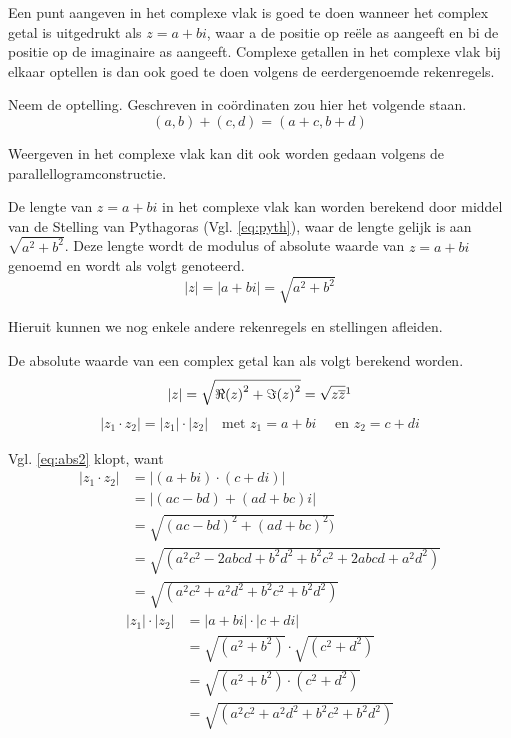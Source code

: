 \documentclass[11pt,fleqn]{book} %
\newcommand*\conj[1]{\overline{#1}}
\begin{document}
Een punt aangeven in het complexe vlak is goed te doen wanneer het complex getal is uitgedrukt als $z = a + bi$, waar a de positie op reële as aangeeft en bi de positie op de imaginaire as aangeeft. Complexe getallen in het complexe vlak bij elkaar optellen is dan ook goed te doen volgens de eerdergenoemde rekenregels.

Neem de optelling. Geschreven in coördinaten zou hier het volgende staan.
\begin{displaymath}
(a,b)+(c,d)=(a+c,b+d)
\end{displaymath}

Weergeven in het complexe vlak kan dit ook worden gedaan volgens de parallellogramconstructie.

De lengte van $z = a + bi$ in het complexe vlak kan worden berekend door middel van de Stelling van Pythagoras (Vgl. \ref{eq:pyth}), waar de lengte gelijk is aan $\sqrt{a^2+b^2}$. Deze lengte wordt de modulus of absolute waarde van $z = a + bi$ genoemd en wordt als volgt genoteerd.
\begin{displaymath}
|z|=|a+bi|=\sqrt{a^2+b^2}
\end{displaymath}

Hieruit kunnen we nog enkele andere rekenregels en stellingen afleiden.
\begin{theorem}
De absolute waarde van een complex getal kan als volgt berekend worden.
\begin{align}\label{eq:abs}
\left|z\right|=\sqrt{{\Re (z)}^2+{\Im (z)}^2}=\sqrt{z\conj{z}}\footnotemark
\end{align}
\begin{align}\label{eq:abs2}
|z_1\cdot z_2|=|z_1|\cdot |z_2|\quad\text{met } z_1=a+bi \quad\text{ en } z_2=c+di
\end{align}
\end{theorem}

Vgl. \ref{eq:abs2} klopt, want
\begin{align*}
|z_1\cdot z_2 |&=|(a+bi)\cdot(c+di)|\\&=|(ac-bd)+(ad+bc)i|\\&=\sqrt{(ac-bd)^2+(ad+bc)^2)}\\&=\sqrt{(a^2 c^2-2abcd+b^2 d^2+b^2 c^2+2abcd+a^2d^2)}\\&=\sqrt{(a^2 c^2+a^2 d^2+b^2 c^2+b^2d^2)}
\end{align*}
\begin{align*}
|z_1 |\cdot|z_2 |&=|a+bi|\cdot|c+di|\\&=\sqrt{(a^2+b^2 )}\cdot\sqrt{(c^2+d^2 )}\\&=\sqrt{(a^2+b^2 )\cdot(c^2+d^2 )}\\&=\sqrt{(a^2 c^2+a^2 d^2+b^2 c^2+b^2d^2)}
\end{align*}
\end{document}
